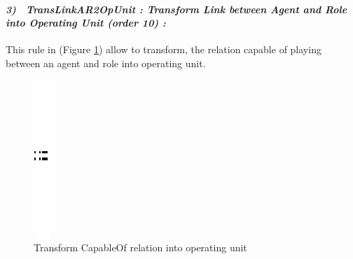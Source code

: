 \paragraph{\emph{3)~ TransLinkAR2OpUnit : Transform Link between Agent and Role into Operating Unit (order 10) :} } This rule in (Figure \ref{fig:Operating Unit for every link capable of playing}) allow to transform, the relation capable of playing between an agent and role into operating unit.
\vspace{1cm}
\begin{figure}[th]
	\centering
	\quad{}
		\includegraphics{ch3/img/sep}
	\quad{}
\caption{\label{fig:Operating Unit for every link capable of playing}Transform CapableOf relation into operating unit} 
\end{figure}
\pagebreak

